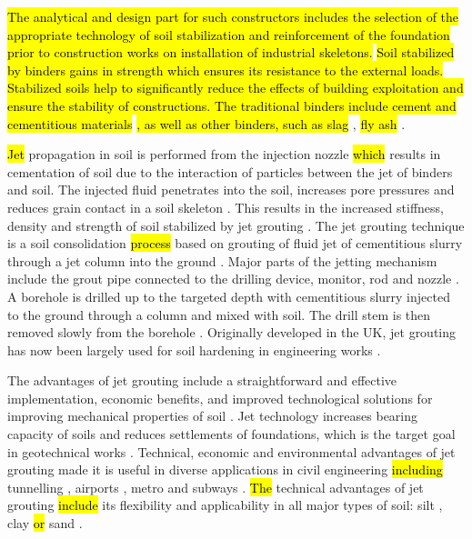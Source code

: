 \documentclass[USenglish,twocolumn]{article}
\begin{document}
\hl{The analytical and design part for such constructors includes the selection of the appropriate technology of soil stabilization and reinforcement of the foundation prior to construction works on installation of industrial skeletons.} 
\hl{Soil stabilized by binders gains in strength which ensures its resistance to the external loads. Stabilized soils help to significantly reduce the effects of building exploitation and ensure the stability of constructions. The traditional binders include cement and cementitious materials} \cite{Zhangetal2020}\hl{, as well as other binders, such as slag} \cite{Proctor}, \hl{fly ash} \cite{GilGolewski,GolewskiSzostak2022}. 

\hl{Jet }propagation in\hl{ }soil is performed from the injection nozzle \hl{which} results in cementation of soil due to the interaction of particles between the jet of binders and soil. The injected fluid penetrates into the soil, increases pore pressures and reduces grain contact in a soil skeleton \cite{Modonietal2006,Croceetal2014}. This results in the increased stiffness, density and strength of soil stabilized by jet grouting \cite{Modonietal2019}. The jet grouting technique is a soil consolidation\hl{ process }based on grouting of fluid jet of cementitious slurry\hl{ }through a jet column into the ground \cite{Mosiici}. Major parts of the jetting mechanism include the grout pipe connected to the drilling device, monitor, rod and nozzle \cite{CovilSkinner}. A borehole is drilled up to the targeted depth with cementitious slurry injected to the ground through a column and mixed with soil. The drill stem is then removed slowly from the borehole \cite{Njock}. Originally developed in the UK, jet grouting has now been largely used for soil hardening in engineering works\hl{ }\cite{Morey,Yoshida,Lunardi}. 

The advantages of jet grouting include a straightforward and effective implementation, economic benefits, and improved technological solutions for improving mechanical properties of soil \cite{modoni2012analysis}. Jet technology increases bearing capacity of soils and reduces settlements of foundations, which is the target goal in geotechnical works \cite{ModoniBzowka}. Technical, economic and environmental advantages of jet grouting \cite{Pinto} made it is useful in diverse applications in civil engineering\hl{ including }tunnelling \cite{Croce}, airports \cite{Hamidi,Lewis}, metro and subways \cite{Farretal2012,Chuetal,Mihalis}. \hl{The }technical advantages\hl{ }of jet grouting \hl{include }its flexibility \cite{Newman} and applicability in all major types of soil: silt \cite{Chuetal2012,HoHu}, clay \cite{Hoetal2005,Ho2009} \hl{or} sand \cite{Hanetal2012}.
\end{document}
